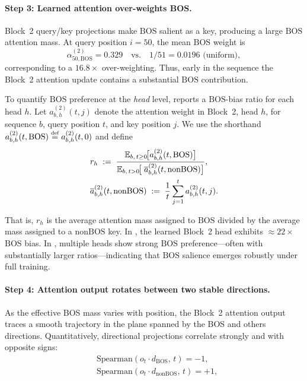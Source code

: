 \documentclass{article}
\theoremstyle{plain}
\theoremstyle{definition}
\theoremstyle{remark}
\begin{document}
\paragraph{Step 3: Learned attention over-weights BOS.}
Block~2 query/key projections make $\text{BOS}$ salient as a key, producing a large $\text{BOS}$ attention mass.
At query position $i=50$, the mean $\text{BOS}$ weight is
\[
\alpha^{(2)}_{50,\text{BOS}}=0.329
\quad\text{vs.}\quad
1/51=0.0196 \text{ (uniform)},
\]
corresponding to a $16.8\times$ over-weighting.
Thus, early in the sequence the Block~2 attention update contains a substantial $\text{BOS}$ contribution.

To quantify $\text{BOS}$ preference at the \emph{head} level,  reports a $\text{BOS}$-bias ratio for each head $h$.
Let $a^{(2)}_{b,h}(t,j)$ denote the attention weight in Block~2, head $h$, for sequence $b$, query position $t$, and key position $j$.
We use the shorthand $a^{(2)}_{b,h}(t,\text{BOS}) \defeq a^{(2)}_{b,h}(t,0)$ and define
\begin{align}
\label{eq:bos_attendence_metric}
&r_h \;:=\;
\frac{\mathbb{E}_{b,\,t\ge0}\!\big[a^{(2)}_{b,h}(t,\text{BOS})\big]}
{\mathbb{E}_{b,\,t>0}\!\big[\;\overline{a}^{(2)}_{b,h}(t,\text{nonBOS})\big]},
\\
&\overline{a}^{(2)}_{b,h}(t,\text{nonBOS}) \;:=\; \frac{1}{t}\sum_{j=1}^{t} a^{(2)}_{b,h}(t,j).
\end{align}

That is, $r_h$ is the average attention mass assigned to $\text{BOS}$ divided by the average mass assigned to a $\text{nonBOS}$ key.
In \modelminimal, the learned Block~2 head exhibits $\approx 22\times$ $\text{BOS}$ bias.
In \modelfull, multiple heads show strong $\text{BOS}$ preference—often with substantially larger ratios—indicating that $\text{BOS}$ salience emerges robustly under full training.



\paragraph{Step 4: Attention output rotates between two stable directions.}
As the effective BOS mass varies with position, the Block~2 attention output traces a smooth trajectory in the plane spanned by the BOS and others directions.
Quantitatively, directional projections correlate strongly and with opposite signs:
\begin{align*}
&\mathrm{Spearman}(o_t\!\cdot\! d_{\text{BOS}},\, t)=-1,\\
&\mathrm{Spearman}(o_t\!\cdot\! d_{\text{nonBOS}},\, t)=+1,
\end{align*}
\end{document}
